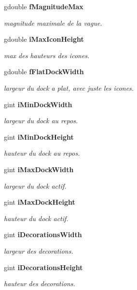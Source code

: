 \begin{CompactItemize}
gdouble {\bf fMagnitudeMax}
\begin{CompactList}\small\item\em magnitude maximale de la vague. \item\end{CompactList}\item 
gdouble {\bf iMaxIconHeight}
\begin{CompactList}\small\item\em max des hauteurs des icones. \item\end{CompactList}\item 
gdouble {\bf fFlatDockWidth}
\begin{CompactList}\small\item\em largeur du dock a plat, avec juste les icones. \item\end{CompactList}\item 
gint {\bf iMinDockWidth}
\begin{CompactList}\small\item\em largeur du dock au repos. \item\end{CompactList}\item 
gint {\bf iMinDockHeight}
\begin{CompactList}\small\item\em hauteur du dock au repos. \item\end{CompactList}\item 
gint {\bf iMaxDockWidth}
\begin{CompactList}\small\item\em largeur du dock actif. \item\end{CompactList}\item 
gint {\bf iMaxDockHeight}
\begin{CompactList}\small\item\em hauteur du dock actif. \item\end{CompactList}\item 
gint {\bf iDecorationsWidth}
\begin{CompactList}\small\item\em largeur des decorations. \item\end{CompactList}\item 
gint {\bf iDecorationsHeight}
\begin{CompactList}\small\item\em hauteur des decorations. \item\end{CompactList}\item 

\end{CompactItemize}
